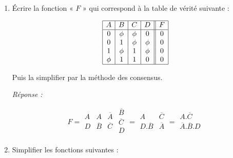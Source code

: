 \begin{enumerate} [label=\arabic*$^\circ$]
\item Écrire la fonction «  $F$ » qui correspond à la table de vérité suivante : 


\[
\begin{array}{|c|c|c|c||c|}       
   \hline 
	 A & B & C & D & F \\
   \hline 
      0 & \phi & \phi & 0 & 0 \\
      0 & 1 & \phi & \phi & 0 \\
      1 & \phi & 1 & \phi & 0 \\
      \phi & 1 & 1 & 0 & 0 \\
    \hline   	 
\end{array}
\]



Puis la simplifier par la méthode des consensus. 


 \emph{Réponse :}
 

 
 \[ F = 
 \begin{array}{|c|c|c} 
     A & A & \overline{A} \\
     D & \overline{B} & \overline{C} \\
 \end{array} \begin{array}{|c|}  \overline{B} \\ \overline{C} \\ D \\ \end{array} 
      = \begin{array}{|c|c|}  A & \overline{C} \\ D . \overline{B} & \overline{A} \\ \end{array} 
      = \begin{array}{|l|} A . \overline{C} \\ \overline{A} . \overline{B} . D \\\end{array} 
 \]
 

 
\item Simplifier les fonctions suivantes : 




\end{enumerate}

